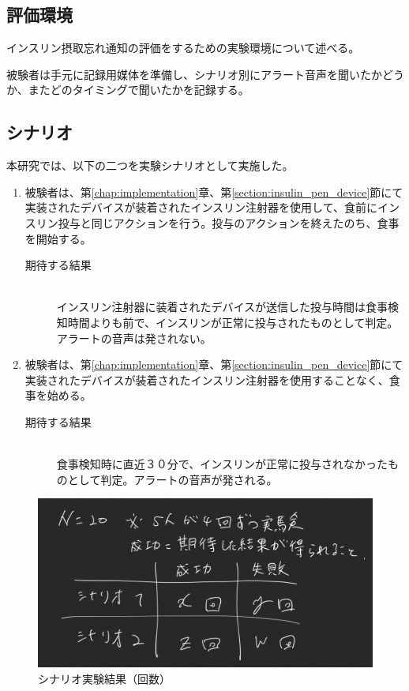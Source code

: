 \subsection{評価環境}
インスリン摂取忘れ通知の評価をするための実験環境について述べる。

被験者は手元に記録用媒体を準備し、シナリオ別にアラート音声を聞いたかどうか、またどのタイミングで聞いたかを記録する。

\subsection{シナリオ}

本研究では、以下の二つを実験シナリオとして実施した。

\begin{enumerate}
  \item 被験者は、第\ref{chap:implementation}章、第\ref{section:insulin_pen_device}節にて実装されたデバイスが装着されたインスリン注射器を使用して、食前にインスリン投与と同じアクションを行う。投与のアクションを終えたのち、食事を開始する。
  \begin{description}
    \item[期待する結果]\mbox{}\\
      インスリン注射器に装着されたデバイスが送信した投与時間は食事検知時間よりも前で、インスリンが正常に投与されたものとして判定。アラートの音声は発されない。
  \end{description}
  \item 被験者は、第\ref{chap:implementation}章、第\ref{section:insulin_pen_device}節にて実装されたデバイスが装着されたインスリン注射器を使用することなく、食事を始める。
  \begin{description}
    \item[期待する結果]\mbox{}\\
      食事検知時に直近３０分で、インスリンが正常に投与されなかったものとして判定。アラートの音声が発される。
  \end{description}
\end{enumerate}

\begin{figure}[htbp]
  \caption{シナリオ実験結果（回数）}
  \label{fig:notify_success_failure}
  \begin{center}
    \includegraphics[bb=0 0 1000 400,width=20cm]{assets/notify_success_failure.png}
  \end{center}
\end{figure}

